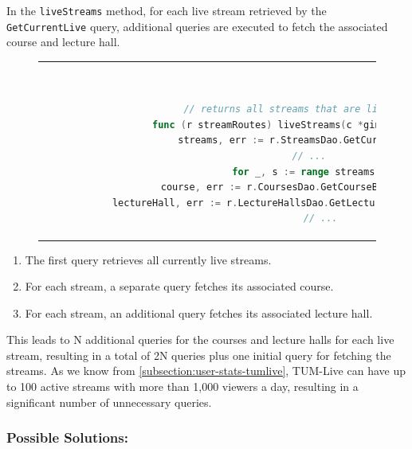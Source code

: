 In the \texttt{liveStreams} method, for each live stream retrieved by the \texttt{GetCurrentLive} query, additional queries are executed to fetch the associated course and lecture hall.

\begin{figure}[htpb]
  \begin{tabular}{c}
  \ \small \begin{lstlisting}[language=Go]
    // returns all streams that are live
    func (r streamRoutes) liveStreams(c *gin.Context) {
        streams, err := r.StreamsDao.GetCurrentLive(c)
        // ...
        for _, s := range streams {
            course, err := r.CoursesDao.GetCourseById(c, s.CourseID)
            lectureHall, err := r.LectureHallsDao.GetLectureHallByID(s.LectureHallID)
            // ...
    \end{lstlisting}
  \end{tabular}
  \label{fig:n+1-example-livestreams}
\end{figure}

\begin{enumerate}
    \item The first query retrieves all currently live streams.
    \item For each stream, a separate query fetches its associated course.
    \item For each stream, an additional query fetches its associated lecture hall.
\end{enumerate}

\noindent This leads to N additional queries for the courses and lecture halls for each live stream, resulting in a total of 2N queries plus one initial query for fetching the streams. As we know from \autoref{subsection:user-stats-tumlive}, TUM-Live can have up to 100 active streams with more than 1,000 viewers a day, resulting in a significant number of unnecessary queries.

\subsubsection{Possible Solutions:}

